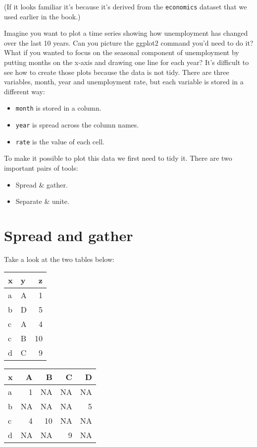 (If it looks familiar it's because it's derived from the
\texttt{economics} dataset that we used earlier in the book.)

Imagine you want to plot a time series showing how unemployment has
changed over the last 10 years. Can you picture the ggplot2 command
you'd need to do it? What if you wanted to focus on the seasonal
component of unemployment by putting months on the x-axis and drawing
one line for each year? It's difficult to see how to create those plots
because the data is not tidy. There are three variables, month, year and
unemployment rate, but each variable is stored in a different way:

\begin{itemize}
\tightlist
\item
  \texttt{month} is stored in a column.
\item
  \texttt{year} is spread across the column names.
\item
  \texttt{rate} is the value of each cell.
\end{itemize}

To make it possible to plot this data we first need to tidy it. There
are two important pairs of tools:

\begin{itemize}
\tightlist
\item
  Spread \& gather.
\item
  Separate \& unite.
\end{itemize}

\section{Spread and gather}\label{sec:spread-gather}

Take a look at the two tables below:

\begin{longtable}[c]{@{}llr@{}}
\toprule
x & y & z\tabularnewline
\midrule
\endhead
a & A & 1\tabularnewline
b & D & 5\tabularnewline
c & A & 4\tabularnewline
c & B & 10\tabularnewline
d & C & 9\tabularnewline
\bottomrule
\end{longtable}

\begin{longtable}[c]{@{}lrrrr@{}}
\toprule
x & A & B & C & D\tabularnewline
\midrule
\endhead
a & 1 & NA & NA & NA\tabularnewline
b & NA & NA & NA & 5\tabularnewline
c & 4 & 10 & NA & NA\tabularnewline
d & NA & NA & 9 & NA\tabularnewline
\bottomrule
\end{longtable}

